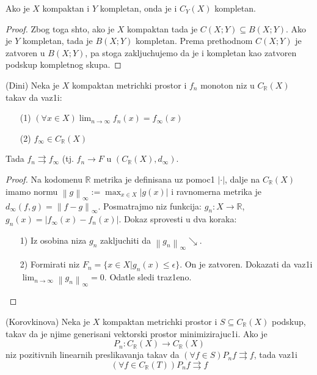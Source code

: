 \documentclass[a4paper,12pt]{article}
\newcommand{\RR}{\mathbb{R}}
\newcommand{\psj}{\subseteq}
\newcommand{\norm}[1]{\left\lVert#1\right\rVert}
\begin{document}
\begin{posl}
Ako je $X$ kompaktan i $Y$ kompletan, onda je i $C_Y(X)$ kompletan.
\end{posl}
\begin{proof}
Zbog toga shto, ako je $X$ kompaktan tada je $C(X;Y) \psj B(X;Y)$. Ako je $Y$ kompletan, tada je $B(X;Y)$ kompletan. Prema prethodnom $C(X;Y)$ je zatvoren u $B(X;Y)$, pa stoga zakljuchujemo da je i kompletan kao zatvoren podskup kompletnog skupa.
\end{proof}

\begin{tma}
(Dini) Neka je $X$ kompaktan metrichki prostor i $f_n$ monoton niz u $C_{\RR}(X)$ takav da vaz1i:
\begin{itemize}
\item[(1)] $(\forall x \in X) \lim_{n \to \infty} f_n(x) = f_{\infty}(x)$
\item[(2)] $f_{\infty} \in C_{\RR}(X)$
\end{itemize}
Tada $f_n \rightrightarrows f_{\infty}$ (tj. $f_n \to F$ u $(C_{\RR}(X), d_{\infty})$.
\end{tma}
\begin{proof}
Na kodomenu $\RR$ metrika je definisana uz pomoc1 $|\cdot |$, dalje na $C_{\RR}(X)$ imamo normu $\norm{g}_{\infty}:= \max_{x\in X}|g(x)|$ i ravnomerna metrika je $d_{\infty}(f,g) = \norm{f - g}_{\infty}$. Posmatrajmo niz funkcija: $g_n:X \to \RR$, $g_n(x) = |f_{\infty}(x) - f_n(x)|$. Dokaz sprovesti u dva koraka:
\begin{itemize}
\item[1)] Iz osobina niza $g_n$ zakljuchiti da $\norm{g_n}_{\infty} \searrow$.
\item[2)] Formirati niz $F_n = \{x \in X | g_n(x) \leq \epsilon \}$. On je zatvoren. Dokazati da vaz1i $\lim_{n \to \infty} \norm{g_n}_{\infty} = 0$. Odatle sledi traz1eno.
\end{itemize}
\end{proof}

\begin{tma}
(Korovkinova) Neka je $X$ kompaktan metrichki prostor i $S \psj C_{\RR}(X)$ podskup, takav da je njime generisani vektorski prostor minimizirajuc1i. Ako je \[P_n: C_{\RR}(X) \to C_{\RR}(X)\]
 niz pozitivnih linearnih preslikavanja takav da $(\forall f \in S) P_n f \rightrightarrows f$, tada vaz1i
\[(\forall f \in C_{\RR}(T)) P_nf \rightrightarrows f \]
\end{tma}
\end{document}
